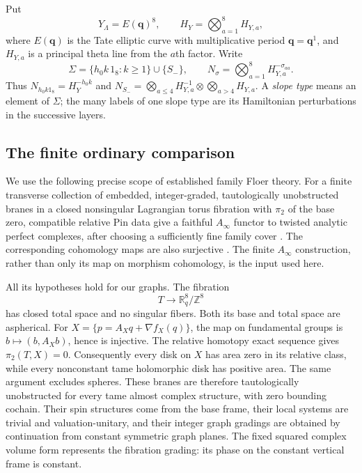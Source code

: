 \documentclass[11pt]{article}
\theoremstyle{definition}
\theoremstyle{remark}
\newcommand{\R}{\mathbb R}
\newcommand{\Z}{\mathbb Z}
\newcommand{\qnov}{\mathbf q}
\newcommand{\Ainf}{A_\infty}
\numberwithin{equation}{section}
\begin{document}
Put
\[
 Y_\Lambda=E(\qnov)^8,\qquad
 H_Y=\bigotimes_{a=1}^8 H_{Y,a},
\]
where $E(\qnov)$ is the Tate elliptic curve with multiplicative period
$\qnov=\qnov^1$, and $H_{Y,a}$ is a principal theta line from the $a$th
factor.  Write
\[
 \Sigma=\{h_0k\,1_8:k\geq1\}\cup\{S_-\},\qquad
 N_\sigma=\bigotimes_{a=1}^8H_{Y,a}^{-\sigma_{aa}}.
\]
Thus $N_{h_0k1_8}=H_Y^{-h_0k}$ and
$N_{S_-}=\bigotimes_{a\leq4}H_{Y,a}^{-1}
\otimes\bigotimes_{a>4}H_{Y,a}$.  A \emph{slope type} means an element
of $\Sigma$; the many labels of one slope type are its Hamiltonian
perturbations in the successive layers.

\subsection{The finite ordinary comparison}

We use the following precise scope of established family Floer theory.
For a finite transverse collection of embedded, integer-graded,
tautologically unobstructed branes in a closed nonsingular Lagrangian
torus fibration with $\pi_2$ of the base zero, compatible relative
Pin data give a faithful $\Ainf$ functor to twisted analytic perfect
complexes, after choosing a sufficiently fine family cover
\cite[Theorem~2.10, \S2.4.1, and Appendix~A]{abouzaid-faithful}.
The corresponding cohomology maps are also surjective
\cite[Theorem~1.1 and Corollary~1.2]{abouzaid-hms}.  The finite
$\Ainf$ construction, rather than only its map on morphism cohomology,
is the input used here.

All its hypotheses hold for our graphs.  The fibration
\[
 T\longrightarrow \R^8_q/\Z^8
\]
has closed total space and no singular fibers.  Both its base and total
space are aspherical.  For
$X=\{p=A_Xq+\nabla f_X(q)\}$, the map on fundamental groups is
$b\mapsto(b,A_Xb)$, hence is injective.  The relative homotopy exact
sequence gives $\pi_2(T,X)=0$.  Consequently every disk on $X$ has
area zero in its relative class, while every nonconstant tame
holomorphic disk has positive area.  The same argument excludes
spheres.  These branes are therefore tautologically unobstructed for
every tame almost complex structure, with zero bounding cochain.
Their spin structures come from the base frame, their local systems
are trivial and valuation-unitary, and their integer graph gradings
are obtained by continuation from constant symmetric graph planes.
The fixed squared complex volume form represents the fibration
grading: its phase on the constant vertical frame is constant.
\end{document}

